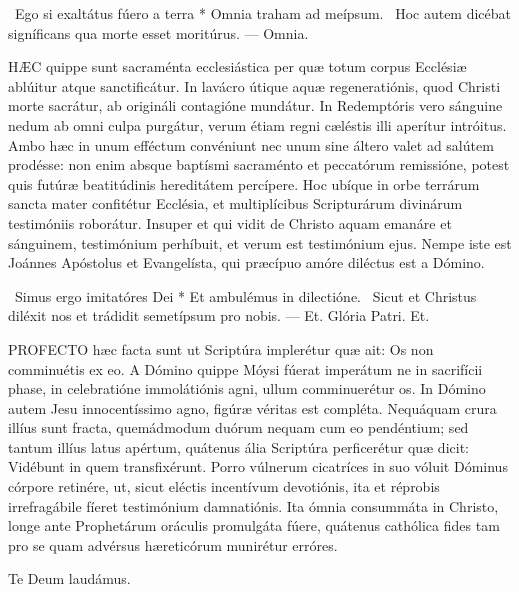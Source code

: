 \R\ Ego si exaltátus fúero a terra * Omnia traham ad meípsum. \V\ Hoc autem dicébat signíficans qua morte esset moritúrus. --- Omnia.


\lettrine[lines=2]{H}{ÆC} quippe sunt sacraménta ecclesiástica per quæ totum corpus Ecclésiæ ablúitur atque sanctificátur. In lavácro útique aquæ regeneratiónis, quod Christi morte sacrátur, ab origináli contagióne mundátur. In Redemptóris vero sánguine nedum ab omni culpa purgátur, verum étiam regni cæléstis illi aperítur intróitus. Ambo hæc in unum efféctum convéniunt nec unum sine áltero valet ad salútem prodésse: non enim absque baptísmi sacraménto et peccatórum remissióne, potest quis futúræ beatitúdinis hereditátem percípere. Hoc ubíque in orbe terrárum sancta mater confitétur Ecclésia, et multiplícibus Scripturárum divinárum testimóniis roborátur. Insuper et qui vidit de Christo aquam emanáre et sánguinem, testimónium perhíbuit, et verum est testimónium ejus. Nempe iste est Joánnes Apóstolus et Evangelísta, qui præcípuo amóre diléctus est a Dómino.

\R\ Simus ergo imitatóres Dei * Et ambulémus in dilectióne. \V\ Sicut et Christus diléxit nos et trádidit semetípsum pro nobis. --- Et. Glória Patri. Et.


\lettrine[lines=2]{P}{ROFECTO} hæc facta sunt ut Scriptúra implerétur quæ ait: Os non comminuétis ex eo. A Dómino quippe Móysi fúerat imperátum ne in sacrifícii phase, in celebratióne immolátiónis agni, ullum comminuerétur os. In Dómino autem Jesu innocentíssimo agno, figúræ véritas est compléta. Nequáquam crura illíus sunt fracta, quemádmodum duórum nequam cum eo pendéntium; sed tantum illíus latus apértum, quátenus ália Scriptúra perficerétur quæ dicit: Vidébunt in quem transfixérunt. Porro vúlnerum cicatríces in suo vóluit Dóminus córpore retinére, ut, sicut eléctis incentívum devotiónis, ita et réprobis irrefragábile fíeret testimónium damnatiónis. Ita ómnia consummáta in Christo, longe ante Prophetárum oráculis promulgáta fúere, quátenus cathólica fides tam pro se quam advérsus hæreticórum munirétur erróres.

Te Deum laudámus.





